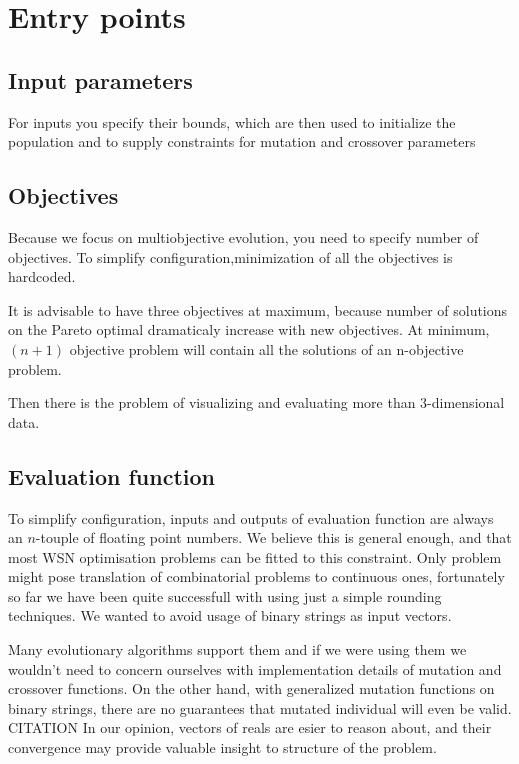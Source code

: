 \documentclass[12pt,oneside]{fithesis2}
\begin{document}
\section{Entry points}

\subsection{Input parameters}
For inputs you specify their bounds, which are then used to initialize the population and to supply constraints for mutation and crossover parameters

\subsection{Objectives}
Because we focus on multiobjective evolution, you need to specify number of objectives. To simplify configuration,minimization of all the objectives is hardcoded.

It is advisable to have three objectives at maximum, because number of solutions on the Pareto optimal dramaticaly increase with new objectives.
At minimum, $(n+1)$ objective problem will contain all the solutions of an n-objective problem. \cite{talbi2009metaheuristics}

Then there is the problem of visualizing and evaluating more than 3-dimensional data.

\subsection{Evaluation function}

To simplify configuration, inputs and outputs of evaluation function are always an $n$-touple of floating point numbers. We believe this is general enough, and that most WSN optimisation problems can be fitted to this constraint. Only problem might pose translation of combinatorial problems to continuous ones, fortunately so far we have been quite successfull with using just a simple rounding techniques. We wanted to avoid usage of binary strings as input vectors.

Many evolutionary algorithms support them and if we were using them we wouldn't need to concern ourselves with implementation details of mutation and crossover functions. On the other hand, with generalized mutation functions on binary strings, there are no guarantees that mutated individual will even be valid. CITATION In our opinion, vectors of reals are esier to reason about, and their convergence may provide valuable insight to structure of the problem.
\end{document}
